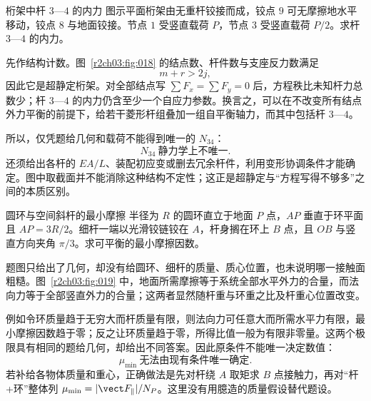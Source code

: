 \begin{practicebox}{桁架中杆 $3$—$4$ 的内力}
图示平面桁架由无重杆铰接而成，铰点 $9$ 可无摩擦地水平移动，铰点 $8$ 与地面铰接。节点 $1$ 受竖直载荷 $P$，节点 $3$ 受竖直载荷 $P/2$。求杆 $3$—$4$ 的内力。
\label{r2ch03:pr:002}
\begin{solution}
先作结构计数。图~\ref{r2ch03:fig:018} 的结点数、杆件数与支座反力数满足
\[
 m+r>2j,
\]
因此它是超静定桁架。对全部结点写 $\sum F_x=\sum F_y=0$ 后，方程秩比未知杆力总数少；杆 $3$—$4$ 的内力仍含至少一个自应力参数。换言之，可以在不改变所有结点外力平衡的前提下，给若干菱形杆组叠加一组自平衡轴力，而其中包括杆 $3$—$4$。

所以，仅凭题给几何和载荷不能得到唯一的 $N_{34}$：
\[
 \boxed{N_{34}\ \text{静力学上不唯一}}.
\]
还须给出各杆的 $EA/L$、装配初应变或删去冗余杆件，利用变形协调条件才能确定。图中取截面并不能消除这种结构不定性；这正是超静定与“方程写得不够多”之间的本质区别。
\figTrussCut
\end{solution}
\end{practicebox}

\begin{practicebox}{圆环与空间斜杆的最小摩擦}
半径为 $R$ 的圆环直立于地面 $P$ 点，$AP$ 垂直于环平面且 $AP=3R/2$。细杆一端以光滑铰链铰在 $A$，杆身搁在环上 $B$ 点，且 $OB$ 与竖直方向夹角 $\pi/3$。求可平衡的最小摩擦因数。
\label{r2ch03:pr:003}
\begin{solution}
题图只给出了几何，却没有给圆环、细杆的质量、质心位置，也未说明哪一接触面粗糙。图~\ref{r2ch03:fig:019} 中，地面所需摩擦等于系统全部水平外力的合量，而法向力等于全部竖直外力的合量；这两者显然随杆重与环重之比及杆重心位置改变。

例如令环质量趋于无穷大而杆质量有限，则法向力可任意大而所需水平力有限，最小摩擦因数趋于零；反之让环质量趋于零，所得比值一般为有限非零量。这两个极限具有相同的题给几何，却给出不同答案。因此原条件不能唯一决定数值：
\[
 \boxed{\mu_{\min}\ \text{无法由现有条件唯一确定}}.
\]
若补给各物体质量和重心，正确做法是先对杆绕 $A$ 取矩求 $B$ 点接触力，再对“杆+环”整体列
$\mu_{\min}=|\vect F_{\parallel}|/N_P$。这里没有用臆造的质量假设替代题设。
\figHoopRodSupport
\end{solution}
\end{practicebox}

